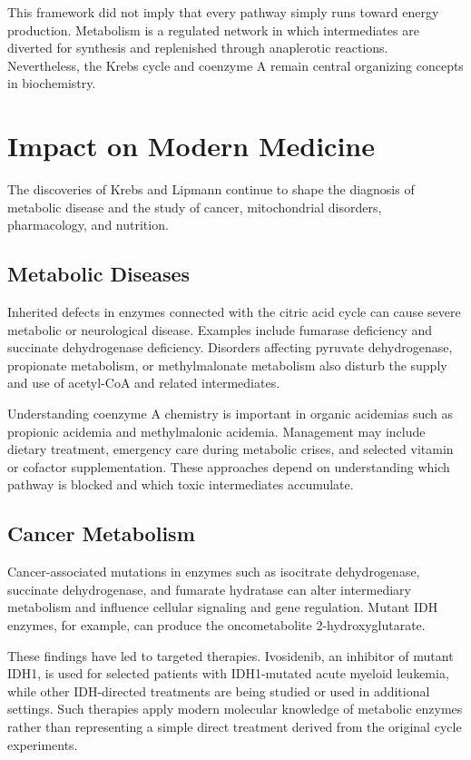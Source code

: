 This framework did not imply that every pathway simply runs toward energy production. Metabolism is a regulated network in which intermediates are diverted for synthesis and replenished through anaplerotic reactions. Nevertheless, the Krebs cycle and coenzyme A remain central organizing concepts in biochemistry.

\section{Impact on Modern Medicine}

The discoveries of Krebs and Lipmann continue to shape the diagnosis of metabolic disease and the study of cancer, mitochondrial disorders, pharmacology, and nutrition.

\subsection{Metabolic Diseases}

Inherited defects in enzymes connected with the citric acid cycle can cause severe metabolic or neurological disease. Examples include fumarase deficiency and succinate dehydrogenase deficiency. Disorders affecting pyruvate dehydrogenase, propionate metabolism, or methylmalonate metabolism also disturb the supply and use of acetyl-CoA and related intermediates.

Understanding coenzyme A chemistry is important in organic acidemias such as propionic acidemia and methylmalonic acidemia. Management may include dietary treatment, emergency care during metabolic crises, and selected vitamin or cofactor supplementation. These approaches depend on understanding which pathway is blocked and which toxic intermediates accumulate.

\subsection{Cancer Metabolism}

Cancer-associated mutations in enzymes such as isocitrate dehydrogenase, succinate dehydrogenase, and fumarate hydratase can alter intermediary metabolism and influence cellular signaling and gene regulation. Mutant IDH enzymes, for example, can produce the oncometabolite 2-hydroxyglutarate.

These findings have led to targeted therapies. Ivosidenib, an inhibitor of mutant IDH1, is used for selected patients with IDH1-mutated acute myeloid leukemia, while other IDH-directed treatments are being studied or used in additional settings. Such therapies apply modern molecular knowledge of metabolic enzymes rather than representing a simple direct treatment derived from the original cycle experiments.

